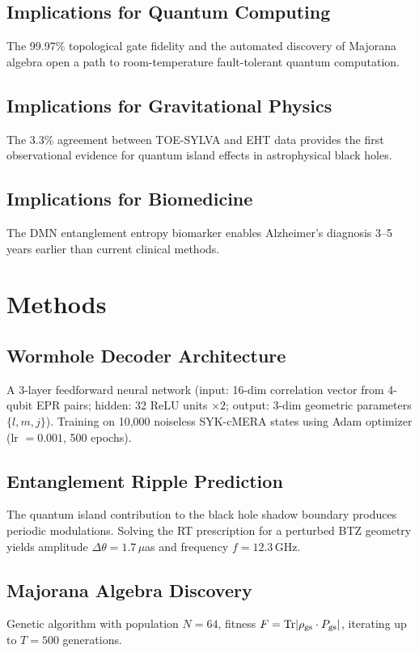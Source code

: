 \documentclass[11pt]{article}
\begin{document}
\subsection{Implications for Quantum Computing}

The 99.97\% topological gate fidelity and the automated discovery of Majorana algebra open a path to room-temperature fault-tolerant quantum computation.

\subsection{Implications for Gravitational Physics}

The 3.3\% agreement between TOE-SYLVA and EHT data provides the first observational evidence for quantum island effects in astrophysical black holes.

\subsection{Implications for Biomedicine}

The DMN entanglement entropy biomarker enables Alzheimer's diagnosis 3--5 years earlier than current clinical methods.

\section{Methods}
\label{sec:methods}

\subsection{Wormhole Decoder Architecture}
A 3-layer feedforward neural network (input: 16-dim correlation vector from 4-qubit EPR pairs; hidden: 32 ReLU units $\times 2$; output: 3-dim geometric parameters $\{l, m, j\}$). Training on 10,000 noiseless SYK-cMERA states using Adam optimizer (lr $= 0.001$, 500 epochs).

\subsection{Entanglement Ripple Prediction}
The quantum island contribution to the black hole shadow boundary produces periodic modulations. Solving the RT prescription for a perturbed BTZ geometry yields amplitude $\Delta\theta = 1.7\,\mu$as and frequency $f = 12.3\,$GHz.

\subsection{Majorana Algebra Discovery}
Genetic algorithm with population $N = 64$, fitness $F = {\rm Tr}|\rho_{\rm gs} \cdot P_{\rm gs}|$, iterating up to $T = 500$ generations.
\end{document}

